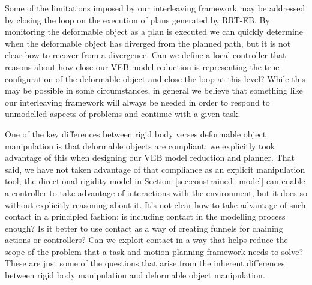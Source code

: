 Some of the limitations imposed by our interleaving framework may be addressed by closing the loop on the execution of plans generated by RRT-EB. By monitoring the deformable object as a plan is executed we can quickly determine when the deformable object has diverged from the planned path, but it is not clear how to recover from a divergence. Can we define a local controller that reasons about how close our VEB model reduction is representing the true configuration of the deformable object and close the loop at this level? While this may be possible in some circumstances, in general we believe that something like our interleaving framework will always be needed in order to respond to unmodelled aspects of problems and continue with a given task.

One of the key differences between rigid body verses deformable object manipulation is that deformable objects are compliant; we explicitly took advantage of this when designing our VEB model reduction and planner. That said, we have not taken advantage of that compliance as an explicit manipulation tool; the directional rigidity model in Section~\ref{sec:constrained_model} can enable a controller to take advantage of interactions with the environment, but it does so without explicitly reasoning about it. It's not clear how to take advantage of such contact in a principled fashion; is including contact in the modelling process enough? Is it better to use contact as a way of creating funnels for chaining actions or controllers? Can we exploit contact in a way that helps reduce the scope of the problem that a task and motion planning framework needs to solve? These are just some of the questions that arise from the inherent differences between rigid body manipulation and deformable object manipulation.